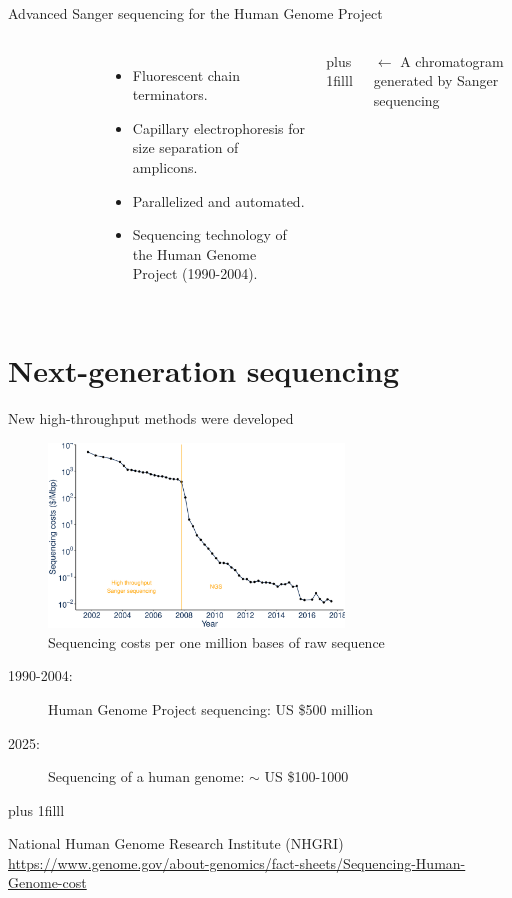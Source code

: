 \documentclass[10pt]{beamer}
\newcommand{\credit}[1]{{\vskip0pt plus 1filll \par \raggedleft \scriptsize \mdseries \color{mDarkBrown} #1 \par}}
\begin{document}
\begin{frame}{Advanced Sanger sequencing for the Human Genome Project}
\begin{columns}[T,onlytextwidth]
\begin{figure}
		\end{figure}
		\vspace{0.2cm}
		\begin{itemize}
			\item Fluorescent chain terminators.
			\item Capillary electrophoresis for size separation of amplicons.
			\item Parallelized and automated.
			\item Sequencing technology of the Human Genome Project (1990-2004).
		\end{itemize}
		\par \vspace{0.5cm}
		\credit{$\leftarrow$ A chromatogram generated by Sanger sequencing}
	\end{columns}
\end{frame}


\section{Next-generation sequencing}


\begin{frame}{New high-throughput methods were developed}
	\begin{center}
		 \begin{figure}
		\includegraphics[width=0.7\textwidth]{./figures/sequencingcosts2018eng.pdf}
		\caption{Sequencing costs per one million bases of raw sequence}
		\end{figure}
	\end{center}
    \begin{description}
	\item [1990-2004:] Human Genome Project sequencing: US \$500 million
	\item [2025:] Sequencing of a human genome: $\sim$ US \$100-1000
\end{description}
	\credit{National Human Genome Research Institute (NHGRI) \linebreak \href{https://www.genome.gov/about-genomics/fact-sheets/Sequencing-Human-Genome-cost}{https://www.genome.gov/about-genomics/fact-sheets/Sequencing-Human-Genome-cost}}
\end{frame}
\end{document}
